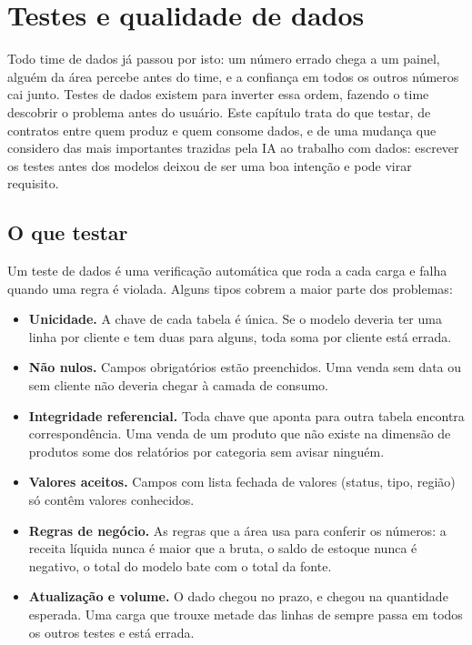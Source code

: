 \chapter{Testes e qualidade de dados}
\label{cap:testes}

Todo time de dados já passou por isto: um número errado chega a um painel, alguém da área
percebe antes do time, e a confiança em todos os outros números cai junto. Testes de dados
existem para inverter essa ordem, fazendo o time descobrir o problema antes do usuário. Este
capítulo trata do que testar, de contratos entre quem produz e quem consome dados, e de uma
mudança que considero das mais importantes trazidas pela IA ao trabalho com dados: escrever
os testes antes dos modelos deixou de ser uma boa intenção e pode virar requisito.

\section{O que testar}
\label{sec:o-que-testar}

Um teste de dados é uma verificação automática que roda a cada carga e falha quando uma regra
é violada. Alguns tipos cobrem a maior parte dos problemas:

\begin{itemize}
  \item \textbf{Unicidade.} A chave de cada tabela é única. Se o modelo deveria ter uma
    linha por cliente e tem duas para alguns, toda soma por cliente está errada.
  \item \textbf{Não nulos.} Campos obrigatórios estão preenchidos. Uma venda sem data ou sem
    cliente não deveria chegar à camada de consumo.
  \item \textbf{Integridade referencial.} Toda chave que aponta para outra tabela encontra
    correspondência. Uma venda de um produto que não existe na dimensão de produtos some dos
    relatórios por categoria sem avisar ninguém.
  \item \textbf{Valores aceitos.} Campos com lista fechada de valores (status, tipo, região)
    só contêm valores conhecidos.
  \item \textbf{Regras de negócio.} As regras que a área usa para conferir os números: a
    receita líquida nunca é maior que a bruta, o saldo de estoque nunca é negativo, o total
    do modelo bate com o total da fonte.
  \item \textbf{Atualização e volume.} O dado chegou no prazo, e chegou na quantidade
    esperada. Uma carga que trouxe metade das linhas de sempre passa em todos os outros
    testes e está errada.
\end{itemize}

